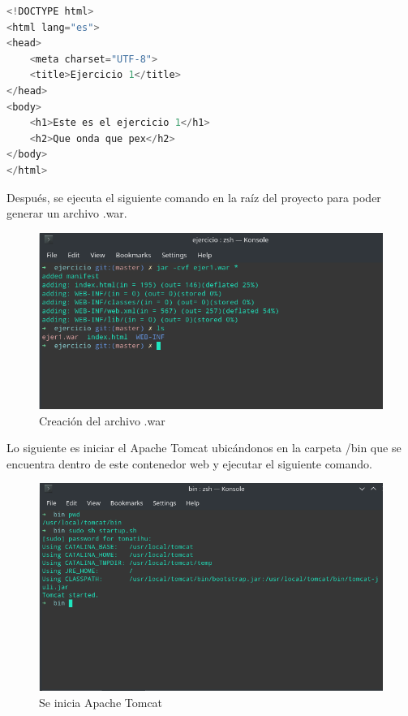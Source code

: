 \documentclass[a4paper,12pt]{article}
\begin{document}
\begin{lstlisting}[language=C, style=customHTML, 
caption={index.html},captionpos=b]
<!DOCTYPE html>
<html lang="es">
<head>
    <meta charset="UTF-8">
    <title>Ejercicio 1</title>
</head>
<body>
    <h1>Este es el ejercicio 1</h1>
    <h2>Que onda que pex</h2>
</body>
</html>
\end{lstlisting}

Después, se ejecuta el siguiente comando en la raíz del proyecto para poder 
generar un archivo .war.

\begin{figure}[H]
\begin{center}
 \includegraphics[width=12cm]{comando.png}
 \caption{Creación del archivo .war}
 \label{fig:comando}
\end{center}
\end{figure}

Lo siguiente es iniciar el Apache Tomcat ubicándonos en la carpeta /bin que se 
encuentra dentro de este contenedor web y ejecutar el siguiente comando.

\begin{figure}[H]
\begin{center}
 \includegraphics[width=12cm]{tomcat.png}
 \caption{Se inicia Apache Tomcat}
 \label{fig:tomcat}
\end{center}
\end{figure}
\end{document}
